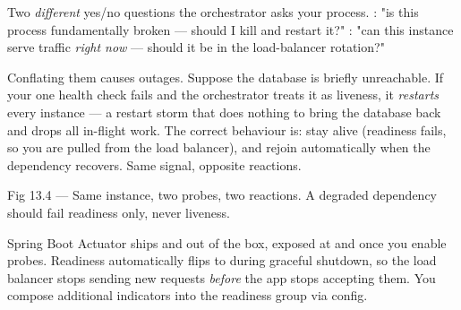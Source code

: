 
 Two \emph{different} yes/no questions the orchestrator asks your process. : "is this process fundamentally broken --- should I kill and restart it?" : "can this instance serve traffic \emph{right now} --- should it be in the load-balancer rotation?"

 Conflating them causes outages. Suppose the database is briefly unreachable. If your one health check fails and the orchestrator treats it as liveness, it \emph{restarts} every instance --- a restart storm that does nothing to bring the database back and drops all in-flight work. The correct behaviour is: stay alive (readiness fails, so you are pulled from the load balancer), and rejoin automatically when the dependency recovers. Same signal, opposite reactions.

\begin{wbfigure}{Fig 13.4 --- Same instance, two probes, two reactions. A degraded dependency should fail readiness only, never liveness.}
\end{wbfigure}

 Spring Boot Actuator ships  and  out of the box, exposed at  and  once you enable probes. Readiness automatically flips to  during graceful shutdown, so the load balancer stops sending new requests \emph{before} the app stops accepting them. You compose additional indicators into the readiness group via config.

